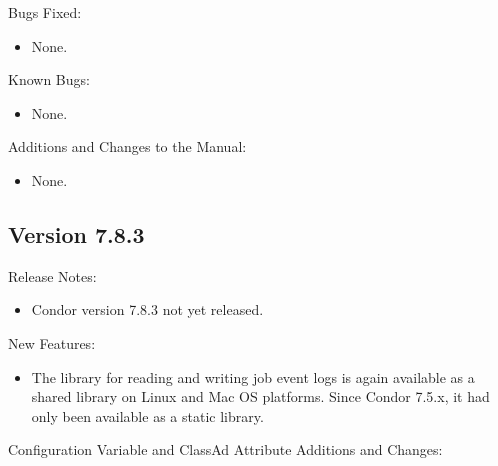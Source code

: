 \noindent Bugs Fixed:

\begin{itemize}

\item None.

\end{itemize}

\noindent Known Bugs:

\begin{itemize}

\item None.

\end{itemize}

\noindent Additions and Changes to the Manual:

\begin{itemize}

\item None.

\end{itemize}


\subsection*{\label{sec:New-7-8-3}Version 7.8.3}

\noindent Release Notes:

\begin{itemize}

\item Condor version 7.8.3 not yet released.

\end{itemize}


\noindent New Features:

\begin{itemize}

\item The  library for reading and writing job event
logs is again available as a shared library on Linux and Mac OS platforms.
Since Condor 7.5.x, it had only been available as a static library.

\end{itemize}

\noindent Configuration Variable and ClassAd Attribute Additions and Changes:

